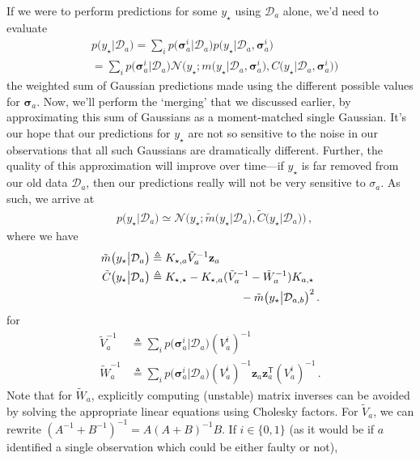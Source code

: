 \documentclass{article}
\newcommand{\cm}[1]{\ensuremath{\mathcal{#1}}}
\newcommand{\bm}[1]{\ensuremath{\mathbf{#1}}}
\newcommand{\data}{\ensuremath{\cm{D}}}
\newcommand{\vect}[1]{\bm{#1}}
\newcommand{\vz}{\vect{z}}
\newcommand{\vs}{\vect{\sigma}}
\newcommand{\amean}[2]{\tilde{{m}}\bigl(#1\big\vert#2\bigr)}
\newcommand{\acov}[2]{\tilde{{C}}\bigl(#1\big\vert#2\bigr)}
\newcommand{\p}[2]{p\bigl(#1\big\vert#2\bigr)}
\newcommand{\fPr}{p}
\newcommand{\Prob}[2]{\fPr\bigl(#1\big\vert#2\bigr)}
\newcommand{\mean}[2]{{m}\bigl(#1\big\vert#2\bigr)}
\newcommand{\cov}[2]{{C}\bigl(#1\big\vert#2\bigr)}
\newcommand{\N}[3]{\cm{N}\bigl(#1;#2,#3\bigr)}
\newcommand{\st}{_{\star}}
\newcommand{\tr}{\ensuremath{\mathsf{T}}}
\newcommand{\defequal}{\triangleq}
\begin{document}
If we were to perform predictions for some $y\st$ using $\data_a$ alone, we'd need to evaluate
\begin{align*}
&\p{y\st}{\data_{a}} = \sum_{i} \Prob{\vs^i_{a}}{\data_a} \p{y\st}{\data_a, \vs^{i}_{a}}\nonumber\\
&=\sum_{i} \Prob{\vs^i_{a}}{\data_a} \N{y\st}{\mean{y\st}{\data_a, \vs^{i}_{a}}}{\cov{y\st}{\data_a, \vs^{i}_{a}}}
\end{align*}
the weighted sum of Gaussian predictions made using the different possible values for $\vs_{a}$. 
Now, we'll perform the `merging' that we discussed earlier, by approximating this sum of Gaussians as a moment-matched single Gaussian. It's our hope that our predictions for $y\st$ are not so sensitive to the noise in our observations that all such Gaussians are dramatically different. Further, the quality of this approximation will improve over time---if $y\st$ is far removed from our old data $\data_a$, then our predictions really will not be very sensitive to $\sigma_a$. As such, we arrive at
\begin{align}
 &\p{y\st}{\data_{a}} \simeq \N{y\st}{\amean{y\st}{\data_a}}{\acov{y\st}{\data_a}}\,,\label{eq:pya}
\end{align}
where we have
\begin{align}
\amean{y\st}{\data_{a}} & \defequal  K_{\star,a} \tilde{V}_a^{-1} \vz_a\label{eq:ameana}\\
\acov{y\st}{\data_{a}}
& \defequal K_{\star,\star} - K_{\star,a}(\tilde{V}_a^{-1}-\tilde{W}_a^{-1})K_{a,\star} \nonumber\\
& \hspace{2.8cm} - \amean{y\st}{\data_{a,b}}^2 \,.\label{eq:acova}
\end{align}
for
\begin{align}
 \tilde{V}_a^{-1}  & \defequal \sum_i \Prob{\vs^i_{a}}{\data_a} (V_a^i)^{-1}\nonumber\\
 \tilde{W}_a^{-1} & \defequal \sum_i \Prob{\vs^i_{a}}{\data_a} (V_a^i)^{-1}\vz_a \vz_a^\tr (V_a^i)^{-1}\,.\label{eq:Wa}
\end{align}
Note that for $\tilde{W}_a$, explicitly computing (unstable) matrix inverses can be avoided by solving the appropriate linear equations using Cholesky factors. 
For $\tilde{V}_a$, we can rewrite
$(A^{-1}+B^{-1})^{-1} = A (A+B)^{-1} B$. If $i\in\{0,1\}$ (as it would be if $a$ identified a single observation which could be either faulty or not),
\end{document}
